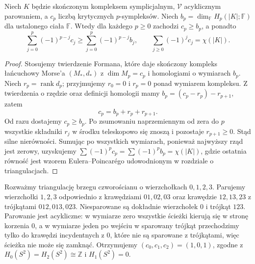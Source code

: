 \begin{twierdzenie}
\label{thm:tg-forman-ineq}
Niech $K$ będzie skończonym kompleksem symplicjalnym,
$\mathcal V$ acyklicznym parowaniem, a $c_p$ liczbą
krytycznych $p$-sympleksów. Niech
$b_p=\dim_{\mathbb F}H_p(|K|;\mathbb F)$
dla ustalonego ciała $\mathbb F$. Wtedy dla każdego
$p\ge0$ zachodzi $c_p\ge b_p$, a ponadto
\[
 \sum_{j=0}^p(-1)^{p-j}c_j
 \ge \sum_{j=0}^p(-1)^{p-j}b_j,
 \qquad
 \sum_{j\ge0}(-1)^jc_j=\chi(|K|).
\]
\end{twierdzenie}

\begin{proof}
Stosujemy twierdzenie Formana, które daje skończony
kompleks łańcuchowy Morse'a $(M_*,d_*)$ z
$\dim M_p=c_p$ i homologiami o wymiarach $b_p$.
Niech $r_p=\operatorname{rank}d_p$; przyjmujemy
$r_0=0$ i $r_p=0$ ponad wymiarem kompleksu.
Z twierdzenia o rzędzie oraz definicji homologii mamy
$b_p=(c_p-r_p)-r_{p+1}$, zatem
\[
 c_p=b_p+r_p+r_{p+1}.
\]
Od razu dostajemy $c_p\ge b_p$.
Po zsumowaniu naprzemiennym od zera do $p$
wszystkie składniki $r_j$ w środku teleskopowo
się znoszą i pozostaje $r_{p+1}\ge0$. Stąd silne
nierówności. Sumując po wszystkich wymiarach,
ponieważ najwyższy rząd jest zerowy, uzyskujemy
$\sum(-1)^pc_p=\sum(-1)^pb_p=\chi(|K|)$,
gdzie ostatnia równość jest wzorem Eulera--Poincarégo
udowodnionym w rozdziale o triangulacjach.
\end{proof}

\begin{przyklad}
Rozważmy triangulację brzegu czworościanu o wierzchołkach
$0,1,2,3$. Parujemy wierzchołki $1,2,3$
odpowiednio z krawędziami $01,02,03$ oraz krawędzie
$12,13,23$ z trójkątami $012,013,023$.
Niesparowane są dokładnie wierzchołek $0$ i trójkąt
$123$. Parowanie jest acykliczne: w wymiarze zero
wszystkie ścieżki kierują się w stronę korzenia $0$,
a w wymiarze jeden po wejściu w sparowany trójkąt
przechodzimy tylko do krawędzi incydentnych z $0$,
które nie są sparowane z trójkątami, więc ścieżka
nie może się zamknąć. Otrzymujemy
$(c_0,c_1,c_2)=(1,0,1)$, zgodne z
$H_0(S^2)=H_2(S^2)\cong\mathbb Z$ i $H_1(S^2)=0$.
\end{przyklad}

